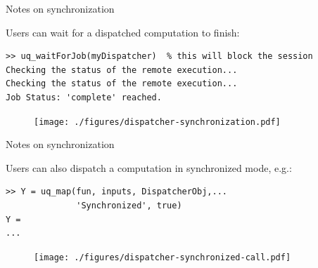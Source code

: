 \documentclass[]{rsuqbeamernew}
\begin{document}
\begin{frame}[fragile]{Notes on synchronization}

Users can wait for a dispatched computation to finish:
\begin{lstlisting}[numbers=none]
>> uq_waitForJob(myDispatcher)  % this will block the session
Checking the status of the remote execution...
Checking the status of the remote execution...
Job Status: 'complete' reached.
\end{lstlisting}
\begin{figure}[htbp]
    \centering
    \texttt{[image: ./figures/dispatcher-synchronization.pdf]}
\end{figure}

\end{frame}

\begin{frame}[fragile]{Notes on synchronization}

Users can also dispatch a computation in {\altx synchronized} mode, e.g.:
\begin{lstlisting}[numbers=none]
>> Y = uq_map(fun, inputs, DispatcherObj,...
              'Synchronized', true)
Y = 
...
\end{lstlisting}
\begin{figure}[htbp]
    \centering
    \texttt{[image: ./figures/dispatcher-synchronized-call.pdf]}
\end{figure}
  
\end{frame}
\end{document}
